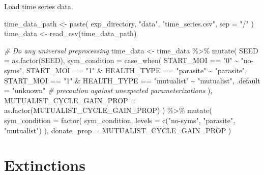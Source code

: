 \documentclass[
]{book}
\newenvironment{Shaded}{\begin{snugshade}}{\end{snugshade}}
\newcommand{\AttributeTok}[1]{\textcolor[rgb]{0.77,0.63,0.00}{#1}}
\newcommand{\CommentTok}[1]{\textcolor[rgb]{0.56,0.35,0.01}{\textit{#1}}}
\newcommand{\FunctionTok}[1]{\textcolor[rgb]{0.00,0.00,0.00}{#1}}
\newcommand{\NormalTok}[1]{#1}
\newcommand{\OtherTok}[1]{\textcolor[rgb]{0.56,0.35,0.01}{#1}}
\newcommand{\SpecialCharTok}[1]{\textcolor[rgb]{0.00,0.00,0.00}{#1}}
\newcommand{\StringTok}[1]{\textcolor[rgb]{0.31,0.60,0.02}{#1}}
\begin{document}
Load time series data.

\begin{Shaded}
\begin{Highlighting}[]
\NormalTok{time\_data\_path }\OtherTok{\textless{}{-}} \FunctionTok{paste}\NormalTok{(}
\NormalTok{  exp\_directory,}
  \StringTok{"data"}\NormalTok{,}
  \StringTok{"time\_series.csv"}\NormalTok{,}
  \AttributeTok{sep =} \StringTok{"/"}
\NormalTok{)}
\NormalTok{time\_data }\OtherTok{\textless{}{-}} \FunctionTok{read\_csv}\NormalTok{(time\_data\_path)}

\CommentTok{\# Do any universal preprocessing}
\NormalTok{time\_data }\OtherTok{\textless{}{-}}\NormalTok{ time\_data }\SpecialCharTok{\%\textgreater{}\%}
  \FunctionTok{mutate}\NormalTok{(}
    \AttributeTok{SEED =} \FunctionTok{as.factor}\NormalTok{(SEED),}
    \AttributeTok{sym\_condition =} \FunctionTok{case\_when}\NormalTok{(}
\NormalTok{      START\_MOI }\SpecialCharTok{==} \StringTok{"0"} \SpecialCharTok{\textasciitilde{}} \StringTok{"no{-}syms"}\NormalTok{,}
\NormalTok{      START\_MOI }\SpecialCharTok{==} \StringTok{"1"} \SpecialCharTok{\&}\NormalTok{ HEALTH\_TYPE }\SpecialCharTok{==} \StringTok{"parasite"} \SpecialCharTok{\textasciitilde{}} \StringTok{"parasite"}\NormalTok{,}
\NormalTok{      START\_MOI }\SpecialCharTok{==} \StringTok{"1"} \SpecialCharTok{\&}\NormalTok{ HEALTH\_TYPE }\SpecialCharTok{==} \StringTok{"mutualist"} \SpecialCharTok{\textasciitilde{}} \StringTok{"mutualist"}\NormalTok{,}
      \AttributeTok{.default =} \StringTok{"unknown"} \CommentTok{\# precaution against unexpected parameterizations}
\NormalTok{    ),}
    \AttributeTok{MUTUALIST\_CYCLE\_GAIN\_PROP =} \FunctionTok{as.factor}\NormalTok{(MUTUALIST\_CYCLE\_GAIN\_PROP)}
\NormalTok{  ) }\SpecialCharTok{\%\textgreater{}\%}
  \FunctionTok{mutate}\NormalTok{(}
    \AttributeTok{sym\_condition =} \FunctionTok{factor}\NormalTok{(}
\NormalTok{      sym\_condition,}
      \AttributeTok{levels =} \FunctionTok{c}\NormalTok{(}\StringTok{"no{-}syms"}\NormalTok{, }\StringTok{"parasite"}\NormalTok{, }\StringTok{"mutualist"}\NormalTok{)}
\NormalTok{    ),}
    \AttributeTok{donate\_prop =}\NormalTok{ MUTUALIST\_CYCLE\_GAIN\_PROP}
\NormalTok{  )}
\end{Highlighting}
\end{Shaded}

\hypertarget{extinctions-3}{%
\section{Extinctions}\label{extinctions-3}}
\end{document}
